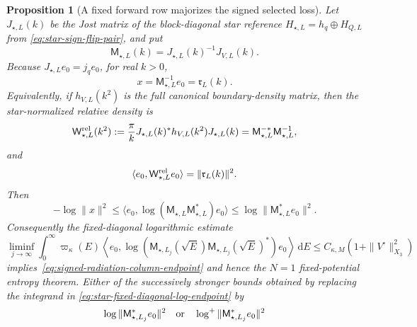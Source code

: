 \documentclass[11pt]{article}
\newcommand{\dd}{\,\mathrm d}
\newtheorem{proposition}[theorem]{Proposition}
\theoremstyle{definition}
\theoremstyle{remark}
\begin{document}
\begin{proposition}[A fixed forward row majorizes the signed selected loss]
\label{prop:forward-row-majorizes-signed-work}
Let $J_{\star,L}(k)$ be the Jost matrix of the block-diagonal star reference
$H_{\star,L}=h_q\oplus H_{Q,L}$ from
\eqref{eq:star-sign-flip-pair}, and put
\begin{equation}
 \mathsf M_{\star,L}(k)=J_{\star,L}(k)^{-1}J_{V,L}(k).
 \label{eq:star-relative-jost-matrix}
\end{equation}
Because $J_{\star,L}e_0=j_qe_0$, for real $k>0$,
\begin{equation}
 x=\mathsf M_{\star,L}^{-1}e_0
   =\mathfrak r_L(k).
\end{equation}
Equivalently, if $h_{V,L}(k^2)$ is the full canonical boundary-density
matrix, then the star-normalized relative density is
\begin{equation}
 \mathsf W_{\star,L}^{\rm rel}(k^2)
 :=\frac{\pi}{k}J_{\star,L}(k)^*h_{V,L}(k^2)J_{\star,L}(k)
 =\mathsf M_{\star,L}^{-*}\mathsf M_{\star,L}^{-1},
 \label{eq:star-relative-density-matrix}
\end{equation}
and
\begin{equation}
 \langle e_0,\mathsf W_{\star,L}^{\rm rel}e_0\rangle
 =\|\mathfrak r_L(k)\|^2.
 \label{eq:star-relative-density-compression}
\end{equation}
Then
\begin{equation}
 -\log\|x\|^2
 \leq\langle e_0,
       \log(\mathsf M_{\star,L}\mathsf M_{\star,L}^*)e_0\rangle
 \leq\log\|\mathsf M_{\star,L}^*e_0\|^2.
 \label{eq:harmonic-arithmetic-row-majorant}
\end{equation}
Consequently the fixed-diagonal logarithmic estimate
\begin{equation}
 \liminf_{j\to\infty}\int_0^\infty\varpi_\kappa(E)
  \left\langle e_0,
   \log\!\left(\mathsf M_{\star,L_j}(\sqrt E)
                    \mathsf M_{\star,L_j}(\sqrt E)^*\right)e_0
  \right\rangle\dd E
 \leq C_{\kappa,M}\left(1+\|V^\circ\|_{X_3}^2\right)
 \label{eq:star-fixed-diagonal-log-endpoint}
\end{equation}
implies~\eqref{eq:signed-radiation-column-endpoint} and hence the $N=1$
fixed-potential entropy theorem.  Either of the successively stronger bounds
obtained by replacing the integrand in
\eqref{eq:star-fixed-diagonal-log-endpoint} by
\begin{equation}
 \log\|\mathsf M_{\star,L_j}^*e_0\|^2
 \quad\hbox{or}\quad
 \log^+\|\mathsf M_{\star,L_j}^*e_0\|^2
 \label{eq:star-forward-row-stronger-integrands}

\end{equation}
\end{proposition}
\end{document}
